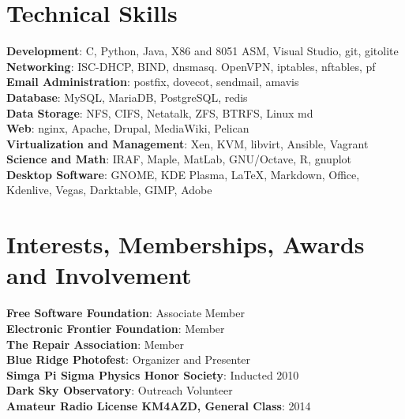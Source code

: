 \documentclass[letterpaper,11pt]{article}
\begin{document}
\section{Technical Skills}
 \begin{itemize}[leftmargin=0.15in, label={}]
    \small{\item{
     \textbf{Development}{: C, Python, Java, X86 and 8051 ASM, Visual Studio, git, gitolite} \\
     \textbf{Networking}{: ISC-DHCP, BIND, dnsmasq. OpenVPN, iptables, nftables, pf} \\
     \textbf{Email Administration}{: postfix, dovecot, sendmail, amavis} \\
     \textbf{Database}{: MySQL, MariaDB, PostgreSQL, redis} \\
     \textbf{Data Storage}{: NFS, CIFS, Netatalk, ZFS, BTRFS, Linux md} \\
     \textbf{Web}{: nginx, Apache, Drupal, MediaWiki, Pelican} \\
     \textbf{Virtualization and Management}{: Xen, KVM, libvirt, Ansible, Vagrant  } \\
     \textbf{Science and Math}{: IRAF, Maple, MatLab, GNU/Octave, R, gnuplot} \\
     \textbf{Desktop Software}{: GNOME, KDE Plasma, \LaTeX, Markdown, Office, Kdenlive, Vegas, Darktable, GIMP, Adobe} 
    }}
 \end{itemize}

\section{Interests, Memberships, Awards and Involvement }
\begin{itemize}[leftmargin=0.15in, label={}]
	\small{\item{
			\textbf{Free Software Foundation}{: Associate Member} \\
			\textbf{Electronic Frontier Foundation}{:  Member} \\
			\textbf{The Repair Association}{: Member} \\
			\textbf{Blue Ridge Photofest}{: Organizer and Presenter} \\
			\textbf{Simga Pi Sigma Physics Honor Society}{: Inducted 2010} \\
         	\textbf{Dark Sky Observatory}{: Outreach Volunteer} \\
         	\textbf{Amateur Radio License KM4AZD, General Class}{: 2014} \\
	}}
\end{itemize}


%


\end{document}
